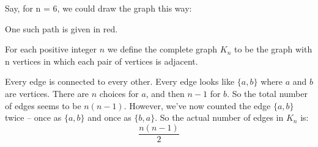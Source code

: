 \begin{questions}
	\begin{solution}
	
		Say, for n = 6, we could draw the graph this way:
		\begin{center}
  	 \begin{adjustbox}{max width=0.6\textwidth}
			\end{adjustbox}
		\end{center}
		
		One such path is given in red.
	\end{solution}

\question
  For each positive integer $n$ we define the complete graph $K_n$ to be the graph with n vertices in which each pair of vertices is adjacent.~\cite{biggs02}

	\begin{solution}
		Every edge is connected to every other.
		Every edge looks like $\{a,b\}$ where $a$ and $b$ are vertices.
		There are $n$ choices for $a$, and then $n-1$ for $b$.
		So the total number of edges seems to be $n(n-1)$.
		However, we've now counted the edge $\{a,b\}$ twice -- once as $\{a,b\}$ and once as $\{b,a\}$.
		So the actual number of edges in $K_n$ is:
		$$ \frac{n(n-1)}{2}$$
	\end{solution}


\end{questions}
